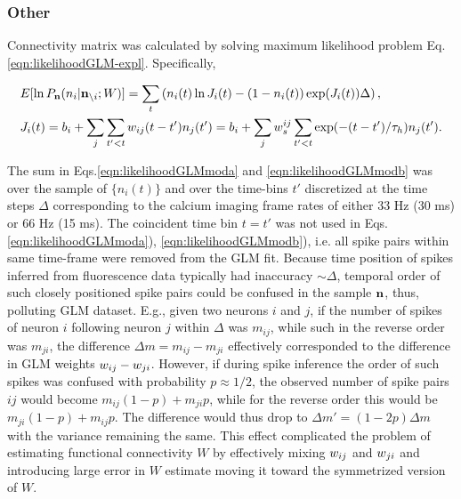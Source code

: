 \clearpage
\subsubsection{Other}

Connectivity matrix was calculated by solving maximum likelihood problem Eq. \eqref{eqn:likelihoodGLM-expl}. Specifically, 

\begin{align}
\label{eqn:likelihoodGLMmoda}&E[\ln P_{\bn}(n_i|{\bf n}_{\i}; W)]=\sum_t \left( n_i(t) \ln J_i(t) - (1-n_i(t)) \exp(J_i(t)) \Delta \right), \\
\label{eqn:likelihoodGLMmodb}&J_i(t)=b_i+\sum\limits_j \sum\limits_{t'<t} \w_{ij}(t-t')n_{j}(t')=
b_i+\sum\limits_j w^{ij}_s \sum\limits_{t'<t} \exp(-(t-t')/\tau_h)n_j(t').
\end{align}

The sum in Eqs.\eqref{eqn:likelihoodGLMmoda} and \eqref{eqn:likelihoodGLMmodb} was over the sample of $\{n_i(t)\}$ and over the time-bins $t'$ discretized at the time steps $\Delta$ corresponding to the calcium imaging frame rates of either 33 Hz (30 ms) or 66 Hz (15 ms). The coincident time bin $t=t'$ was not used in Eqs.\eqref{eqn:likelihoodGLMmoda}), \eqref{eqn:likelihoodGLMmodb}), i.e.  all spike pairs within same time-frame were removed from the GLM fit.  Because time position of spikes inferred from fluorescence data typically had inaccuracy $\sim \Delta$, temporal order of such closely positioned spike pairs could be confused in the sample ${\bf n}$, thus, polluting GLM dataset.  E.g., given two neurons $i$ and $j$, if the number of spikes of neuron $i$ following neuron $j$ within $\Delta$ was $m_{ij}$, while such in the reverse order was $m_{ji}$, the difference $\Delta m = m_{ij}-m_{ji}$ effectively corresponded to the difference in GLM weights $w_{ij}-w_{ji}$. However, if during spike inference the order of such spikes was confused with probability $p\approx 1/2$, the observed number of spike pairs $ij$ would become $m_{ij}(1-p)+m_{ji}p$, while for the reverse order this would be $m_{ji}(1-p)+m_{ij}p$. The difference would thus drop to $\Delta m '= (1-2p)\Delta m$ with the variance remaining the same. This effect complicated the problem of estimating functional connectivity $W$ by effectively mixing $w_{ij}$ and $w_{ji}$ and introducing large error in $W$ estimate moving it toward the symmetrized version of $W$.

